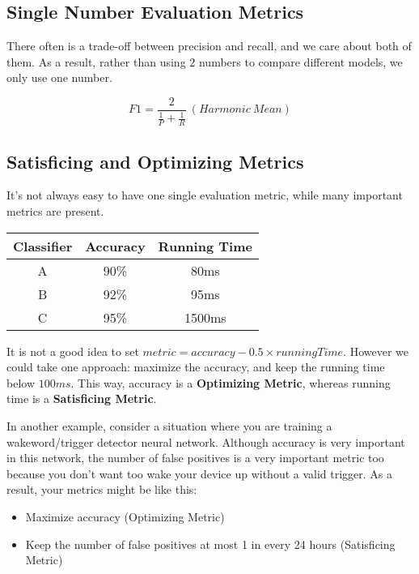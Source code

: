 \subsection{Single Number Evaluation Metrics}
There often is a trade-off between precision and recall, and we care about both of them. As a result, 
rather than using 2 numbers to compare different models, we only use one number. 

$$
F1 =  \frac{2}{\frac{1}{P}+\frac{1}{R}}\ (Harmonic\ Mean)
$$

\subsection{Satisficing and Optimizing Metrics}

It's not always easy to have one single evaluation metric, while many important metrics are present. 

\begin{table}[H]
    \begin{tabular}{|c|c|c|}
    \hline
    Classifier & Accuracy & Running Time \\ \hline
    A          & 90\%     & 80ms         \\ \hline
    B          & 92\%     & 95ms         \\ \hline
    C          & 95\%     & 1500ms       \\ \hline
    \end{tabular}
\end{table}

It is not a good idea to set $metric = accuracy - 0.5 \times runningTime$. 
However we could take one approach: maximize the accuracy, and keep the running time below $100ms$. 
This way, accuracy is a \textbf{Optimizing Metric}, whereas running time is a \textbf{Satisficing Metric}. 

In another example, consider a situation where you are training a wakeword/trigger detector neural network. 
Although accuracy is very important in this network, the number of false positives is a very important metric too because you don't want too wake your device up without a valid trigger.
As a result, your metrics might be like this: 
\begin{itemize}
    \item Maximize accuracy (Optimizing Metric)
    \item Keep the number of false positives at most 1 in every 24 hours (Satisficing Metric)
\end{itemize}

